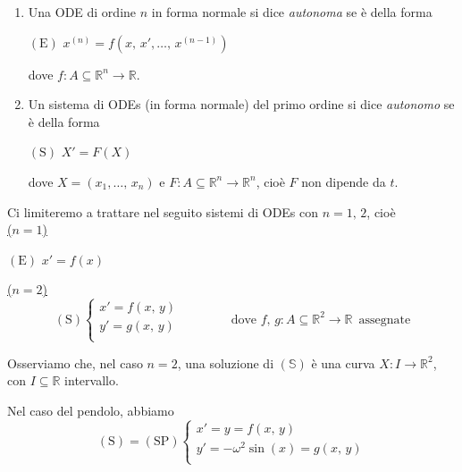 \begin{definition}
\mbox{}
\begin{enumerate}[labelindent=\parindent,leftmargin=*,label=\textnormal{(\roman*)},start=1]
\item Una ODE di ordine $n$ in forma normale si dice \emph{autonoma} se è della forma
\begin{center}
$\mathrm{(E)}$
\hfill
$\displaystyle
x^{(n)} = f(x,\,x',\ldots,\,x^{(n-1)})
$
\hfill \null \\
\end{center}
dove $f : A \subseteq \mathbb{R}^n \longrightarrow \mathbb{R}$.
\item Un sistema di ODEs (in forma normale) del primo ordine si dice \emph{autonomo} se è della forma
\begin{center}
$\mathrm{(S)}$
\hfill
$\displaystyle
X' = F(X)
$
\hfill \null \\
\end{center}
dove $X = (x_1,\ldots,\,x_n)$ e $F : A \subseteq \mathbb{R}^n \longrightarrow \mathbb{R}^n$, cioè $F$ non dipende da $t$.
\end{enumerate}
\end{definition}

Ci limiteremo a trattare nel seguito sistemi di ODEs con $n = 1,\,2$, cioè\\
\noindent\underline{($n = 1$)}
\begin{center}
$\mathrm{(E)}$
\hfill
$\displaystyle
x' = f(x)
$
\hfill \null \\
\end{center}
\vskip 12pt
\noindent\underline{($n = 2$)}
$$
\mathrm{(S)}
\begin{cases}
x' = f(x,\,y)\\
y' = g(x,\,y)\\
\end{cases}
\qquad\qquad
\text{dove } f,\,g : A \subseteq \mathbb{R}^2 \longrightarrow \mathbb{R} \, \text{ assegnate}
$$

Osserviamo che, nel caso $n = 2$, una soluzione di $\mathbb{(S)}$ è una curva $X : I \longrightarrow \mathbb{R}^2$, con $I \subseteq \mathbb{R}$ intervallo.

Nel caso del pendolo, abbiamo
$$
\mathrm{(S)} = \mathrm{(SP)}
\begin{cases}
x' = y = f(x,\,y)\\
y' = -\omega^2\sin(x) = g(x,\,y)\\
\end{cases}
$$

